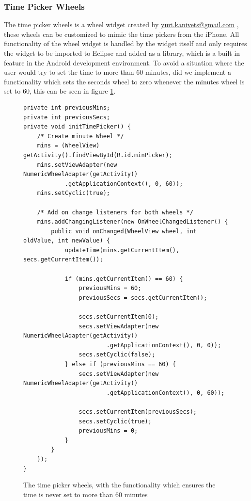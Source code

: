 \subsubsection*{Time Picker Wheels}
The time picker wheels is a wheel widget created by \url{yuri.kanivets@gmail.com} \cite{web:android:customize:wheel}, these wheels can be customized to mimic the time pickers from the iPhone.
All functionality of the wheel widget is handled by the widget itself and only requires the widget to be imported to Eclipse and added as a library, which is a built in feature in the Android development environment.
To avoid a situation where the user would try to set the time to more than 60 minutes, did we implement a functionality which sets the seconds wheel to zero whenever the minutes wheel is set to 60, this can be seen in figure \ref{code:customize:time_picker_wheels}.

\begin{figure}[H]
\begin{lstlisting}
private int previousMins;
private int previousSecs;
private void initTimePicker() {
	/* Create minute Wheel */
	mins = (WheelView) getActivity().findViewById(R.id.minPicker);
	mins.setViewAdapter(new NumericWheelAdapter(getActivity()
			.getApplicationContext(), 0, 60));
	mins.setCyclic(true);

	/* Add on change listeners for both wheels */
	mins.addChangingListener(new OnWheelChangedListener() {
		public void onChanged(WheelView wheel, int oldValue, int newValue) {
			updateTime(mins.getCurrentItem(), secs.getCurrentItem());

			if (mins.getCurrentItem() == 60) {
				previousMins = 60;
				previousSecs = secs.getCurrentItem();

				secs.setCurrentItem(0);
				secs.setViewAdapter(new NumericWheelAdapter(getActivity()
						.getApplicationContext(), 0, 0));
				secs.setCyclic(false);
			} else if (previousMins == 60) {
				secs.setViewAdapter(new NumericWheelAdapter(getActivity()
						.getApplicationContext(), 0, 60));

				secs.setCurrentItem(previousSecs);
				secs.setCyclic(true);
				previousMins = 0;
			}
		}
	});
}
\end{lstlisting}
\caption{The time picker wheels, with the functionality which ensures the time is never set to more than 60 minutes}%
\label{code:customize:time_picker_wheels}%
\end{figure}


